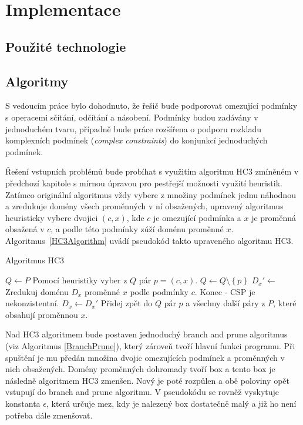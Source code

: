 \chapter{Implementace}
\section{Použité technologie}
\section{Algoritmy}

S vedoucím práce bylo dohodnuto, že řešič bude podporovat omezující podmínky s operacemi sčítání, odčítání a násobení. Podmínky budou zadávány v jednoduchém tvaru, případně bude práce rozšířena o podporu rozkladu komplexních podmínek (\emph{complex constraints}) do konjunkcí jednoduchých podmínek. 

Řešení vstupních problémů bude probíhat s využitím algoritmu HC3 zmíněném v předchozí kapitole s mírnou úpravou pro pestřejší možnosti využití heuristik. Zatímco originální algoritmus vždy vybere z množiny podmínek jednu náhodnou a zredukuje domény všech proměnných v ní obsažených, upravený algoritmus heuristicky vybere dvojici $(c, x)$, kde $c$ je omezující podmínka a $x$ je proměnná obsažená v $c$, a podle této podmínky zúží doménu proměnné $x$. Algoritmus~\ref{HC3Algorithm} uvádí pseudokód takto upraveného algoritmu HC3.

\begin{algorithm}
\caption{Algoritmus HC3}
\label{HC3Algorithm}
\begin{algorithmic}[1]
\State $Q \gets P$
\State Pomocí heuristiky vyber z $Q$ pár $p = (c, x)$.
\State $Q \gets Q \setminus \left\{ p \right\}$
\State $D_x' \gets$ Zredukuj doménu $D_x$ proměnné $x$ podle podmínky $c$.
\State Konec - CSP je nekonzistentní.
\EndIf
{}
\State $D_x \gets D_x'$
\State Přidej zpět do $Q$ pár $p$ a všechny další páry z $P$, které obsahují proměnnou $x$.
\EndIf
\EndWhile
\EndProcedure
\end{algorithmic}
\end{algorithm}

Nad HC3 algoritmem bude postaven jednoduchý branch and prune algoritmus (viz Algoritmus \ref{BranchPrune}), který zároveň tvoří hlavní funkci programu. Při spuštění je mu předán množina dvojic omezujících podmínek a proměnných v nich obsažených. Domény proměnných dohromady tvoří box a tento box je následně algoritmem HC3 zmenšen. Nový je poté rozpůlen a obě poloviny opět vstupují do branch and prune algoritmu. V pseudokódu se rovněž vyskytuje konstanta $\epsilon$, která určuje mez, kdy je nalezený box dostatečně malý a již ho není potřeba dále zmenšovat.

